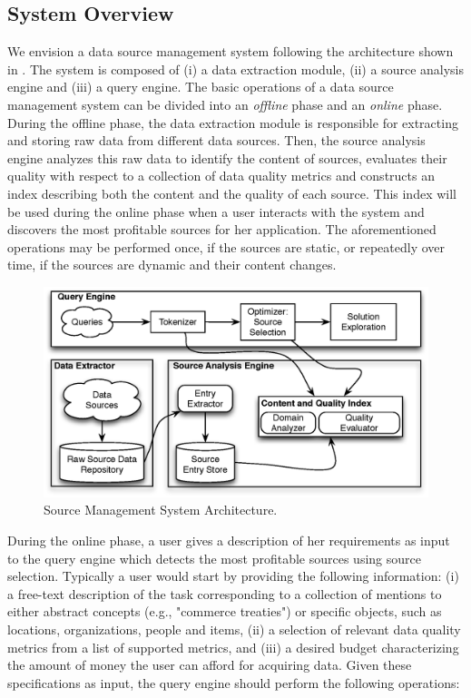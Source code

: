 \documentclass{sig-alternate}
\begin{document}
\subsection{System Overview}
\label{sec:architecture}
We envision a data source management system following the architecture shown in . The system is composed of (i) a data extraction module, (ii) a source analysis engine and (iii) a query engine. The basic operations of a data source management system can be divided into an {\em offline} phase and an {\em online} phase. During the offline phase, the data extraction module is responsible for extracting and storing raw data from different data sources. Then, the source analysis engine analyzes this raw data to identify the content of sources, evaluates their quality with respect to a collection of data quality metrics and constructs an index describing both the content and the quality of each source. This index will be used during the online phase when a user interacts with the system and discovers the most profitable sources for her application. The aforementioned operations may be performed once, if the sources are static, or repeatedly over time, if the sources are dynamic and their content changes. 
\begin{figure}
	\begin{center}
	\includegraphics[clip,scale=0.5]{fig/system.eps}
	\vspace{-20pt}
	\caption{Source Management System Architecture.}
	\label{fig:system}
	\end{center}
	\vspace{-20pt}
\end{figure}
During the online phase, a user gives a description of her requirements as input to the query engine which detects the most profitable sources using source selection. Typically a user would start by providing the following information: (i) a free-text description of the task corresponding to a collection of mentions to either abstract concepts (e.g., "commerce treaties") or specific objects, such as locations, organizations, people and items, (ii) a selection of relevant data quality metrics from a list of supported metrics, and (iii) a desired budget characterizing the amount of money the user can afford for acquiring data. Given these specifications as input, the query engine should perform the following operations:
\end{document}
